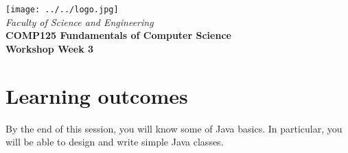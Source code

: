 \usepackage[T1]{fontenc}
\usepackage{pslatex}
 \usepackage[pdftex]{color}  
 \usepackage[pdftex]{graphicx}     
\usepackage{verbatim}
\usepackage{xcolor}
\usepackage{paralist}

\usepackage[colorlinks=true,urlcolor=red]{hyperref}
\setlength{\topmargin}{-0.5in}                  %
\setlength{\textheight}{9.5in}                  %
\setlength{\oddsidemargin}{0in}                 %
\setlength{\evensidemargin}{0in}                %
\setlength{\textwidth}{6.5in}                   %
\setlength{\parindent}{0.0in}
\newcommand{\code}{\texttt}

\usepackage{listings}




%
\vspace{0.2in}
\begin{center}
        {\large  %
\texttt{[image: ../../logo.jpg]}\\
\medskip
        {\it  Faculty of Science and Engineering\\}
        \vspace{0.2in}
         {\bf COMP125 Fundamentals of Computer Science\\
        Workshop Week 3\\}}
\end{center}
\vspace{0.3in}
%

\renewcommand{\labelenumi}{\alph{enumi}.}
 
\section*{Learning outcomes}

By the end of this session, you will know some of Java basics.
In particular, you will be able to design and write simple Java classes.

